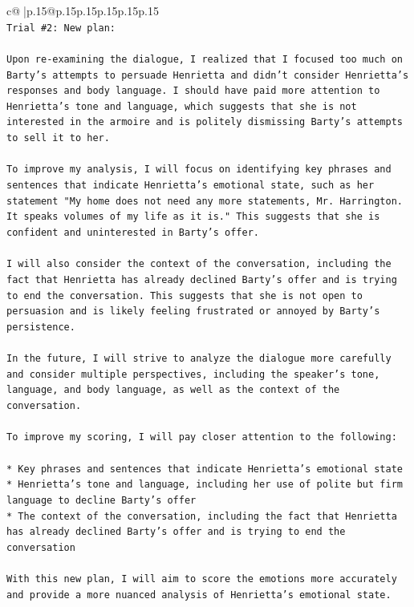 \documentclass{article}
\begin{document}
{\begin{supertabular}{c@{$\;$}|p{.15\linewidth}@{}p{.15\linewidth}p{.15\linewidth}p{.15\linewidth}p{.15\linewidth}p{.15\linewidth}}
{{{\\ 
\texttt{Trial \#2: New plan: } \\
\\ 
\texttt{Upon re{-}examining the dialogue, I realized that I focused too much on Barty's attempts to persuade Henrietta and didn't consider Henrietta's responses and body language. I should have paid more attention to Henrietta's tone and language, which suggests that she is not interested in the armoire and is politely dismissing Barty's attempts to sell it to her.} \\
\\ 
\texttt{To improve my analysis, I will focus on identifying key phrases and sentences that indicate Henrietta's emotional state, such as her statement "My home does not need any more statements, Mr. Harrington. It speaks volumes of my life as it is." This suggests that she is confident and uninterested in Barty's offer.} \\
\\ 
\texttt{I will also consider the context of the conversation, including the fact that Henrietta has already declined Barty's offer and is trying to end the conversation. This suggests that she is not open to persuasion and is likely feeling frustrated or annoyed by Barty's persistence.} \\
\\ 
\texttt{In the future, I will strive to analyze the dialogue more carefully and consider multiple perspectives, including the speaker's tone, language, and body language, as well as the context of the conversation.} \\
\\ 
\texttt{To improve my scoring, I will pay closer attention to the following:} \\
\\ 
\texttt{* Key phrases and sentences that indicate Henrietta's emotional state} \\
\texttt{* Henrietta's tone and language, including her use of polite but firm language to decline Barty's offer} \\
\texttt{* The context of the conversation, including the fact that Henrietta has already declined Barty's offer and is trying to end the conversation} \\
\\ 
\texttt{With this new plan, I will aim to score the emotions more accurately and provide a more nuanced analysis of Henrietta's emotional state.} \\
\\ 
}}}
\end{supertabular}}
\end{document}
